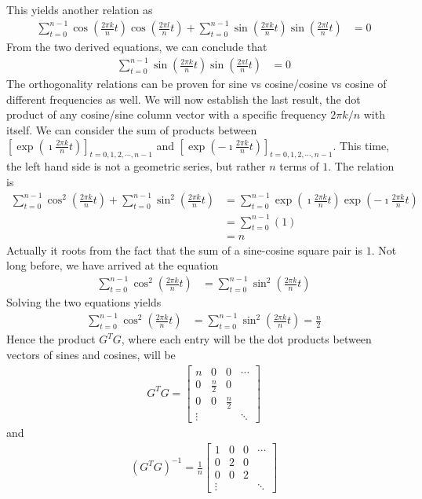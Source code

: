 This yields another relation as
\begin{align*}
\sum_{t=0}^{n-1} \cos(\frac{2\pi k}{n} t)\cos(\frac{2\pi l}{n} t) + \sum_{t=0}^{n-1} \sin(\frac{2\pi k}{n} t)\sin(\frac{2\pi l}{n} t) &= 0 
\end{align*}
From the two derived equations, we can conclude that
\begin{align*}
\sum_{t=0}^{n-1} \sin(\frac{2\pi k}{n} t)\sin(\frac{2\pi l}{n} t) &= 0    
\end{align*}
The orthogonality relations can be proven for sine vs cosine/cosine vs cosine of different frequencies as well. We will now establish the last result, the dot product of any cosine/sine column vector with a specific frequency $2\pi k/n$ with itself. We can consider the sum of products between
$\left[\exp(\imath \frac{2\pi k}{n} t)\right]_{t = 0,1,2,\cdots,n-1}$ and $\left[\exp(-\imath \frac{2\pi k}{n} t)\right]_{t = 0,1,2,\cdots,n-1}$. This time, the left hand side is not a geometric series, but rather $n$ terms of $1$. The relation is
\begin{align*}
\sum_{t=0}^{n-1} \cos^2(\frac{2\pi k}{n} t) + \sum_{t=0}^{n-1} \sin^2(\frac{2\pi k}{n} t) &= \sum_{t=0}^{n-1} \exp(\imath \frac{2\pi k}{n} t)\exp(-\imath \frac{2\pi k}{n} t) \\
&= \sum_{t=0}^{n-1} (1) \\
&= n
\end{align*}
Actually it roots from the fact that the sum of a sine-cosine square pair is $1$. Not long before, we have arrived at the equation
\begin{align*}
\sum_{t=0}^{n-1} \cos^2(\frac{2\pi k}{n} t) &= \sum_{t=0}^{n-1} \sin^2(\frac{2\pi k}{n} t)     
\end{align*}
Solving the two equations yields
\begin{align*}
\sum_{t=0}^{n-1} \cos^2(\frac{2\pi k}{n} t) &= \sum_{t=0}^{n-1} \sin^2(\frac{2\pi k}{n} t) = \frac{n}{2}    
\end{align*}
Hence the product $G^TG$, where each entry will be the dot products between vectors of sines and cosines, will be
\begin{align*}
G^TG =
\begin{bmatrix}
n & 0 & 0 & \cdots \\
0 & \frac{n}{2} & 0 & \\
0 & 0 & \frac{n}{2} & \\
\vdots & & & \ddots
\end{bmatrix}
\end{align*}
and
\begin{align*}
(G^TG)^{-1} = \frac{1}{n}
\begin{bmatrix}
1 & 0 & 0 & \cdots \\
0 & 2 & 0 & \\
0 & 0 & 2 & \\
\vdots & & & \ddots
\end{bmatrix}    
\end{align*}
